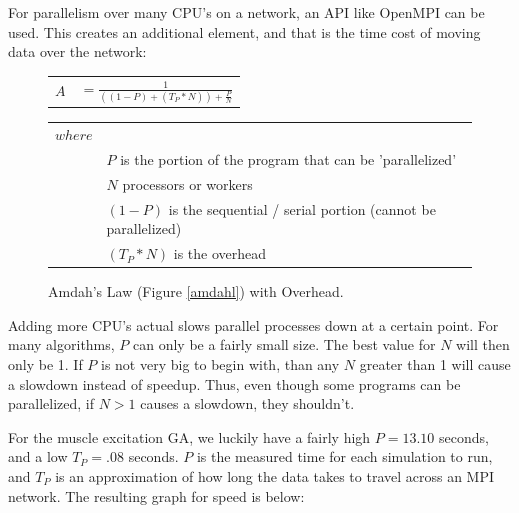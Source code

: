 For parallelism over many CPU's on a network, an API like OpenMPI can be used.
This creates an additional element, and that is the time cost of moving data
over the network:

\begin{figure}[h]
	\begin{center}
		\LARGE
		\begin{tabular}{l r}
			$ A $	&	$ = \frac{1}{((1 - P) + (T_P * N)) + \frac{P}{N}} $ \\
		\end{tabular}

		\normalsize
		\begin{tabular}{l l}
			$ where $  & \\
				&	$ P $ is the portion of the program that can be 'parallelized' \\
				&	$ N $ processors or workers \\
				&	$ (1 - P) $ is the sequential / serial portion (cannot be parallelized) \\
				&	$ (T_P * N) $ is the overhead \\
		\end{tabular}
		\caption{Amdah's Law (Figure \ref{amdahl}) with Overhead. } 
		\label{amdahl_overhead}
	\end{center}
\end{figure}
\normalsize

Adding more CPU's actual slows parallel processes down at a certain point.
For many algorithms, $ P $ can only be a fairly small size. The best value for $ N $ will then only be 1. If $ P $ is not very big to begin with, than any $ N $ greater than 1 will cause a slowdown instead 
of speedup. Thus, even though some programs can be parallelized, if $ N > 1 $ causes a slowdown, they shouldn't.

For the muscle excitation GA, we luckily have a fairly high $ P = 13.10 $
seconds,  and a low $ T_P = .08 $ seconds. $ P $ is the measured time for each
simulation to run, and $ T_P $ is an approximation of how long the data takes
to travel across an MPI network. The resulting graph for speed is below:

